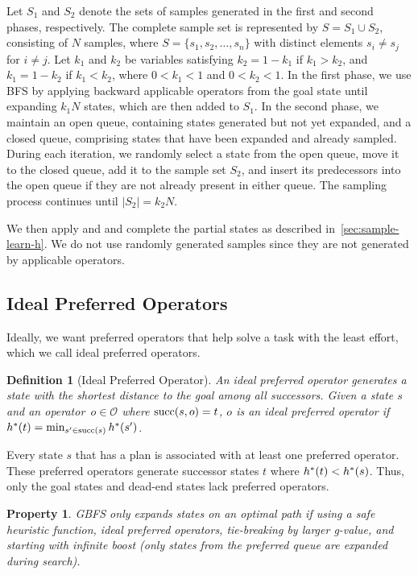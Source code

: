 \documentclass[ppgc,diss,english]{iiufrgs}
\newtheorem{definition}{Definition}
\newtheorem{property}{Property}
\newcommand{\ppi}[2][inline]{\todo[color=purple!50,linecolor={purple!100},#1,fancyline,author=Pedro]{#2}}
\begin{document}
Let $S_1$ and $S_2$ denote the sets of samples generated in the first and second phases, respectively. The complete sample set is represented by $S = S_1 \cup S_2$, consisting of $N$ samples, where $S = \{ s_1, s_2, \ldots, s_n\}$ with distinct elements $s_i \neq s_j$ for $i \neq j$. Let $k_1$ and $k_2$ be variables satisfying $k_2 = 1 - k_1$ if $k_1 > k_2$, and $k_1 = 1 - k_2$ if $k_1 < k_2$, where $0 < k_1 < 1$ and $0 < k_2 < 1$.
In the first phase, we use BFS by applying backward applicable operators from the goal state until expanding $k_1N$ states, which are then added to $S_1$.
In the second phase, we maintain an open queue, containing states generated but not yet expanded, and a closed queue, comprising states that have been expanded and already sampled. During each iteration, we randomly select a state from the open queue, move it to the closed queue, add it to the sample set $S_2$, and insert its predecessors into the open queue if they are not already present in either queue. The sampling process continues until $|S_2| = k_2N$.

\ppi{Add pseudocode.}

We then apply \sai and \sui and complete the partial states as described in~\cref{sec:sample-learn-h}. We do not use randomly generated samples since they are not generated by applicable operators.

\subsection{Ideal Preferred Operators}
\label{sec:sample-ideal-po}
Ideally, we want preferred operators that help solve a task with the least effort, which we call ideal preferred operators.

\begin{definition}[Ideal Preferred Operator]\label{def:ideal_preferred_operator}
  An ideal preferred operator generates a state with the shortest distance to the goal among all successors. Given a state $s$ and an operator~$o \in \mathcal{O}$ where $\operatorname{succ}(s,o) = t$, $o$ is an ideal preferred operator if $h^*({t}) = \min_{s' \in \operatorname{succ}(s)} h^*({s'})$.
\end{definition}

Every state $s$ that has a plan is associated with at least one preferred operator. These preferred operators generate successor states $t$ where $h^*({t}) < h^*({s})$. Thus, only the goal states and dead-end states lack preferred operators.

\begin{property}
  \label{prop:ideal-optimal}
  GBFS only expands states on an optimal path if using a safe heuristic function, ideal preferred operators, tie-breaking by larger g-value, and starting with infinite boost (only states from the preferred queue are expanded during search).
\end{property}
\end{document}
